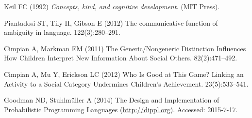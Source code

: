 \documentclass{pnastwo}
\begin{document}
\begin{article}
\begin{thebibliography}{10}
Keil FC (1992) {\em Concepts, kind, and cognitive development.}
\newblock (MIT Press).

Piantadosi ST, Tily H, Gibson E (2012) {The communicative function of ambiguity
  in language}.
 122(3):280--291.

Cimpian A, Markman EM (2011) {The Generic/Nongeneric Distinction Influences How
  Children Interpret New Information About Social Others}.
 82(2):471--492.

Cimpian A, Mu Y, Erickson LC (2012) {Who Is Good at This Game? Linking an
  Activity to a Social Category Undermines Children's Achievement}.
 23(5):533--541.

Goodman ND, Stuhlm\"{u}ller A (2014) {The Design and Implementation of
  Probabilistic Programming Languages} (\url{http://dippl.org}).
\newblock Accessed: 2015-7-17.

\end{thebibliography}

\end{article}
\end{document}
